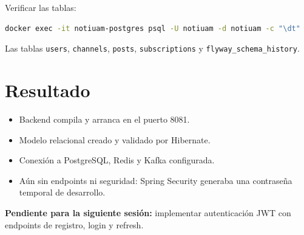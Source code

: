 Verificar las tablas:

\begin{lstlisting}[language=bash]
docker exec -it notiuam-postgres psql -U notiuam -d notiuam -c "\dt"
\end{lstlisting}

\begin{exito}
Las tablas \texttt{users}, \texttt{channels}, \texttt{posts}, \texttt{subscriptions} y \texttt{flyway\_schema\_history}.
\end{exito}

\section{Resultado}

\begin{exito}
\begin{itemize}[leftmargin=*]
  \item Backend compila y arranca en el puerto 8081.
  \item Modelo relacional creado y validado por Hibernate.
  \item Conexión a PostgreSQL, Redis y Kafka configurada.
  \item Aún sin endpoints ni seguridad: Spring Security generaba una contraseña temporal de desarrollo.
\end{itemize}
\end{exito}

\textbf{Pendiente para la siguiente sesión:} implementar autenticación JWT con endpoints de registro, login y refresh.